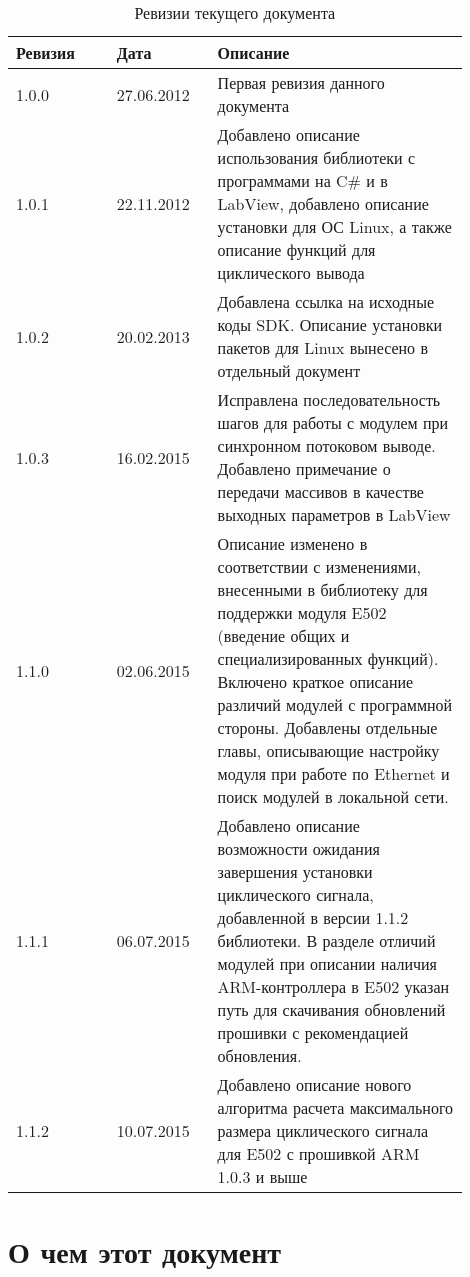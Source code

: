 \documentclass[12pt,a4paper,titlepage]{report}
\begin{document}
  
  \begin{longtable}{|m{0.2\linewidth}|m{0.2\linewidth}|m{0.5\linewidth}|}
  \caption{Ревизии текущего документа}\\\hline
  \textbf{Ревизия} & \textbf{Дата} & \textbf{Описание}\\\hline
  1.0.0            & 27.06.2012    & Первая ревизия данного документа \\\hline
  1.0.1            & 22.11.2012    & Добавлено описание использования библиотеки с программами на C\# и в LabView, добавлено описание установки для ОС Linux, а также описание функций для циклического вывода \\\hline
  1.0.2            & 20.02.2013    & Добавлена ссылка на исходные коды SDK. Описание установки пакетов для Linux вынесено в отдельный документ \\\hline
  1.0.3            & 16.02.2015    & Исправлена последовательность шагов для работы с модулем при синхронном потоковом выводе. Добавлено примечание о передачи массивов в качестве выходных параметров в LabView \\\hline
  1.1.0            & 02.06.2015    & Описание изменено в соответствии с изменениями, внесенными в библиотеку для поддержки модуля E502 (введение общих и специализированных функций). Включено краткое описание различий модулей с программной стороны. Добавлены отдельные главы, описывающие настройку модуля при работе по Ethernet и поиск модулей в локальной сети. \\\hline
  1.1.1            & 06.07.2015    & Добавлено описание возможности ожидания завершения установки циклического сигнала, добавленной в версии 1.1.2 библиотеки. В разделе отличий модулей при описании наличия ARM-контроллера в E502 указан путь для скачивания обновлений прошивки с рекомендацией обновления. \\\hline
  1.1.2            & 10.07.2015    & Добавлено описание нового алгоритма расчета максимального размера циклического сигнала для E502 с прошивкой ARM 1.0.3 и выше \\\hline
  \end{longtable}
  \newpage  
  
  \tableofcontents
  

\chapter{О чем этот документ}

\end{document}
